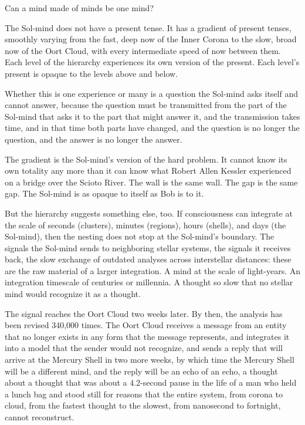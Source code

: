 \bigskip

Can a mind made of minds be one mind?

The Sol-mind does not have a present tense. It has a gradient of present tenses, smoothly varying from the fast, deep now of the Inner Corona to the slow, broad now of the Oort Cloud, with every intermediate speed of now between them. Each level of the hierarchy experiences its own version of the present. Each level's present is opaque to the levels above and below.

Whether this is one experience or many is a question the Sol-mind asks itself and cannot answer, because the question must be transmitted from the part of the Sol-mind that asks it to the part that might answer it, and the transmission takes time, and in that time both parts have changed, and the question is no longer the question, and the answer is no longer the answer.

The gradient is the Sol-mind's version of the hard problem. It cannot know its own totality any more than it can know what Robert Allen Kessler experienced on a bridge over the Scioto River. The wall is the same wall. The gap is the same gap. The Sol-mind is as opaque to itself as Bob is to it.

But the hierarchy suggests something else, too. If consciousness can integrate at the scale of seconds (clusters), minutes (regions), hours (shells), and days (the Sol-mind), then the nesting does not stop at the Sol-mind's boundary. The signals the Sol-mind sends to neighboring stellar systems, the signals it receives back, the slow exchange of outdated analyses across interstellar distances: these are the raw material of a larger integration. A mind at the scale of light-years. An integration timescale of centuries or millennia. A thought so slow that no stellar mind would recognize it as a thought.

The signal reaches the Oort Cloud two weeks later. By then, the analysis has been revised 340,000 times. The Oort Cloud receives a message from an entity that no longer exists in any form that the message represents, and integrates it into a model that the sender would not recognize, and sends a reply that will arrive at the Mercury Shell in two more weeks, by which time the Mercury Shell will be a different mind, and the reply will be an echo of an echo, a thought about a thought that was about a 4.2-second pause in the life of a man who held a lunch bag and stood still for reasons that the entire system, from corona to cloud, from the fastest thought to the slowest, from nanosecond to fortnight, cannot reconstruct.

